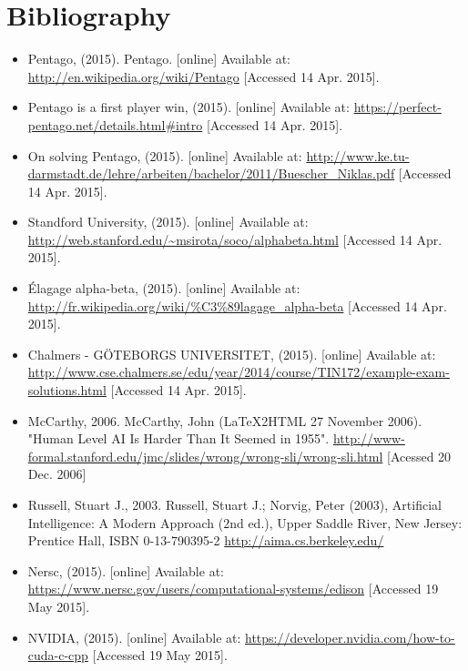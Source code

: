 \section{Bibliography}

\begin{itemize}
	\item Pentago, (2015). Pentago. [online] Available at:
	\url{http://en.wikipedia.org/wiki/Pentago} [Accessed 14 Apr. 2015].

	\item Pentago is a first player win, (2015). [online] Available at: 
	\url{https://perfect-pentago.net/details.html#intro} [Accessed 14 Apr. 2015].

	\item On solving Pentago, (2015). [online] Available at: 
	\url{http://www.ke.tu-darmstadt.de/lehre/arbeiten/bachelor/2011/Buescher_Niklas.pdf}
	[Accessed 14 Apr. 2015].

	\item Standford University, (2015).  [online] Available at: 
	\url{http://web.stanford.edu/~msirota/soco/alphabeta.html} [Accessed 14 Apr.
	2015].

	\item Élagage alpha-beta, (2015).  [online] Available at:
	\url{http://fr.wikipedia.org/wiki/%C3%89lagage_alpha-beta} [Accessed 14 Apr. 2015].

	\item Chalmers - GÖTEBORGS UNIVERSITET, (2015). [online] Available at:  
	\url{http://www.cse.chalmers.se/edu/year/2014/course/TIN172/example-exam-solutions.html}
	[Accessed 14 Apr. 2015].

	\item McCarthy, 2006. McCarthy, John (LaTeX2HTML 27 November 2006). "Human
	Level AI Is Harder Than It Seemed in 1955".
	\url{http://www-formal.stanford.edu/jmc/slides/wrong/wrong-sli/wrong-sli.html}
	[Acessed 20 Dec. 2006]

	\item Russell, Stuart J., 2003. Russell, Stuart J.; Norvig, Peter (2003),
	Artificial Intelligence: A Modern Approach (2nd ed.), Upper Saddle River, New
	Jersey: Prentice Hall, ISBN 0-13-790395-2  \url{http://aima.cs.berkeley.edu/}

	\item Nersc, (2015). [online] Available at:
	\url{https://www.nersc.gov/users/computational-systems/edison} [Accessed 19 May
	2015].

	\item NVIDIA, (2015). [online] Available at:
	\url{https://developer.nvidia.com/how-to-cuda-c-cpp} [Accessed 19 May 2015].
	
\end{itemize}

\newpage